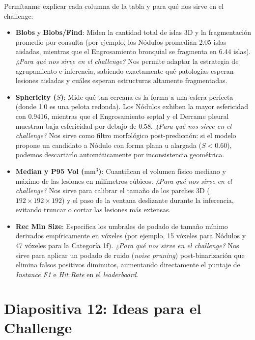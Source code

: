 \documentclass[11pt, a4paper]{article}
\begin{document}
Permítanme explicar cada columna de la tabla y para qué nos sirve en el challenge:
\begin{itemize}[leftmargin=1.5em]
    \item \textbf{Blobs} y \textbf{Blobs/Find}: Miden la cantidad total de islas 3D y la fragmentación promedio por consulta (por ejemplo, los Nódulos promedian 2.05 islas aisladas, mientras que el Engrosamiento bronquial se fragmenta en 6.44 islas). \textit{¿Para qué nos sirve en el challenge?} Nos permite adaptar la estrategia de agrupamiento e inferencia, sabiendo exactamente qué patologías esperan lesiones aisladas y cuáles esperan estructuras altamente fragmentadas.
    \item \textbf{Sphericity ($S$)}: Mide qué tan cercana es la forma a una esfera perfecta (donde 1.0 es una pelota redonda). Los Nódulos exhiben la mayor esfericidad con 0.9416, mientras que el Engrosamiento septal y el Derrame pleural muestran baja esfericidad por debajo de 0.58. \textit{¿Para qué nos sirve en el challenge?} Nos sirve como filtro morfológico post-predicción: si el modelo propone un candidato a Nódulo con forma plana u alargada ($S < 0.60$), podemos descartarlo automáticamente por inconsistencia geométrica.
    \item \textbf{Median y P95 Vol ($\text{mm}^3$)}: Cuantifican el volumen físico mediano y máximo de las lesiones en milímetros cúbicos. \textit{¿Para qué nos sirve en el challenge?} Nos sirve para calibrar el tamaño de los parches 3D ($192 \times 192 \times 192$) y el paso de la ventana deslizante durante la inferencia, evitando truncar o cortar las lesiones más extensas.
    \item \textbf{Rec Min Size}: Especifica los umbrales de podado de tamaño mínimo derivados empíricamente en vóxeles (por ejemplo, 15 vóxeles para Nódulos y 47 vóxeles para la Categoría 1f). \textit{¿Para qué nos sirve en el challenge?} Nos sirve para aplicar un podado de ruido (\textit{noise pruning}) post-binarización que elimina falsos positivos diminutos, aumentando directamente el puntaje de \textit{Instance F1} e \textit{Hit Rate} en el \textit{leaderboard}.
\end{itemize}

\bigskip

\section{Diapositiva 12: Ideas para el Challenge}
\end{document}
